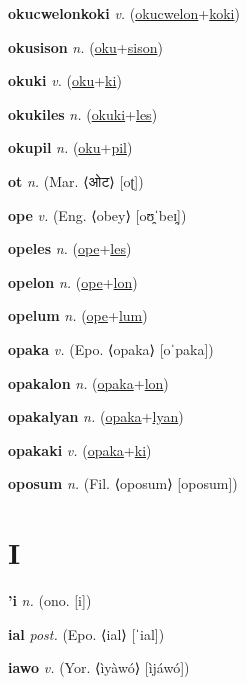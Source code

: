 \textbf{\hypertarget{okucwelonkoki}{okucwelonkoki}} \textit{v.} (\hyperlink{okucwelon}{okucwelon}+\allowbreak \hyperlink{koki}{koki})


\textbf{\hypertarget{okusison}{okusison}} \textit{n.} (\hyperlink{oku}{oku}+\allowbreak \hyperlink{sison}{sison})


\textbf{\hypertarget{okuki}{okuki}} \textit{v.} (\hyperlink{oku}{oku}+\allowbreak \hyperlink{ki}{ki})


\textbf{\hypertarget{okukiles}{okukiles}} \textit{n.} (\hyperlink{okuki}{okuki}+\allowbreak \hyperlink{les}{les})


\textbf{\hypertarget{okupil}{okupil}} \textit{n.} (\hyperlink{oku}{oku}+\allowbreak \hyperlink{pil}{pil})


\textbf{\hypertarget{ot}{ot}} \textit{n.} (Mar. ⟨{\devanagari{}ओट}⟩ [oʈ])


\textbf{\hypertarget{ope}{ope}} \textit{v.} (Eng. ⟨obey⟩ [oʊ̯ˈbeɪ̯])


\textbf{\hypertarget{opeles}{opeles}} \textit{n.} (\hyperlink{ope}{ope}+\allowbreak \hyperlink{les}{les})


\textbf{\hypertarget{opelon}{opelon}} \textit{n.} (\hyperlink{ope}{ope}+\allowbreak \hyperlink{lon}{lon})


\textbf{\hypertarget{opelum}{opelum}} \textit{n.} (\hyperlink{ope}{ope}+\allowbreak \hyperlink{lum}{lum})


\textbf{\hypertarget{opaka}{opaka}} \textit{v.} (Epo. ⟨opaka⟩ [oˈpaka])


\textbf{\hypertarget{opakalon}{opakalon}} \textit{n.} (\hyperlink{opaka}{opaka}+\allowbreak \hyperlink{lon}{lon})


\textbf{\hypertarget{opakalyan}{opakalyan}} \textit{n.} (\hyperlink{opaka}{opaka}+\allowbreak \hyperlink{lyan}{lyan})


\textbf{\hypertarget{opakaki}{opakaki}} \textit{v.} (\hyperlink{opaka}{opaka}+\allowbreak \hyperlink{ki}{ki})


\textbf{\hypertarget{oposum}{oposum}} \textit{n.} (Fil. ⟨oposum⟩ [oposum])


\section{I}

\textbf{\hypertarget{'i}{'i}} \textit{n.} (ono. [i])


\textbf{\hypertarget{ial}{ial}} \textit{post.} (Epo. ⟨ial⟩ [ˈial])


\textbf{\hypertarget{iawo}{iawo}} \textit{v.} (Yor. ⟨ìyàwó⟩ [ìjáwó])


